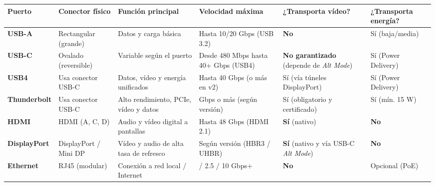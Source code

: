 \documentclass[11.5pt]{article}
\begin{document}
	\begin{table}[H]
		\centering
		\footnotesize
		\renewcommand{\arraystretch}{1.3}
		\begin{tabularx}{\textwidth}{
				| >{\raggedright\arraybackslash}p{2.1cm} 
				| >{\raggedright\arraybackslash}p{2.4cm} 
				| X 
				| >{\centering\arraybackslash}p{2.3cm} 
				| >{\centering\arraybackslash}p{2.0cm} 
				| >{\centering\arraybackslash}p{2.2cm} |
			}
			\hline
			\textbf{Puerto} & \textbf{Conector físico} & \textbf{Función principal} & \textbf{Velocidad máxima} & \textbf{¿Transporta vídeo?} & \textbf{¿Transporta energía?} \\
			\hline
			\textbf{USB-A} & Rectangular (grande) & Datos y carga básica & Hasta 10/20 Gbps (USB 3.2) & \textbf{No} & Sí (baja/media) \\
			\hline
			\textbf{USB-C} & Ovalado (reversible) & Variable según el puerto & Desde 480 Mbps hasta 40+ Gbps (USB4) & \textbf{No garantizado} (depende de \textit{Alt Mode}) & Sí (Power Delivery) \\
			\hline
			\textbf{USB4} & Usa conector USB-C & Datos, vídeo y energía unificados & Hasta 40 Gbps (o más en v2) & Sí (vía túneles DisplayPort) & Sí (Power Delivery) \\
			\hline
			\textbf{Thunderbolt} & Usa conector USB-C & Alto rendimiento, PCIe, vídeo y datos & 40 Gbps o más (según versión) & Sí (obligatorio y certificado) & Sí (mín. 15 W) \\
			\hline
			\textbf{HDMI} & HDMI (A, C, D) & Audio y vídeo digital a pantallas & Hasta 48 Gbps (HDMI 2.1) & \textbf{Sí} (nativo) & \textbf{No} \\
			\hline
			\textbf{DisplayPort} & DisplayPort / Mini DP & Vídeo y audio de alta tasa de refresco & Según versión (HBR3 / UHBR) & \textbf{Sí} (nativo y vía USB-C \textit{Alt Mode}) & \textbf{No} \\
			\hline
			\textbf{Ethernet} & RJ45 (modular) & Conexión a red local / Internet & 1 / 2.5 / 10 Gbps+ & \textbf{No} & Opcional (PoE) \\
			\hline
		\end{tabularx}
	\end{table}
	
\end{document}
